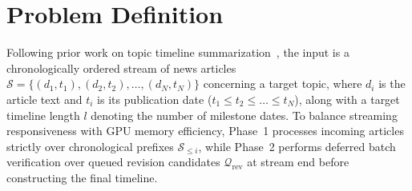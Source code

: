 \documentclass[journal]{IEEEtran}
\begin{document}
\begin{table}[t]
\centering
\caption{Design-Scope Comparison With Representative TLS Paradigms. A checkmark denotes an explicitly described mechanism, not an empirical capability test.}
\label{tab:related_work}
\renewcommand{\arraystretch}{1.10}
\end{table}

\section{Problem Definition}
\label{sec:problem}

Following prior work on topic timeline summarization~\cite{ghalandari2020examining, hu2024moments}, the input is a chronologically ordered stream of news articles $\mathcal{S} = \{(d_1, t_1), (d_2, t_2), \dots, (d_N, t_N)\}$ concerning a target topic, where $d_i$ is the article text and $t_i$ is its publication date ($t_1 \le t_2 \le \dots \le t_N$), along with a target timeline length $l$ denoting the number of milestone dates. To balance streaming responsiveness with GPU memory efficiency, Phase~1 processes incoming articles strictly over chronological prefixes $\mathcal{S}_{\le i}$, while Phase~2 performs deferred batch verification over queued revision candidates $\mathcal{Q}_{\text{rev}}$ at stream end before constructing the final timeline.
\end{document}

